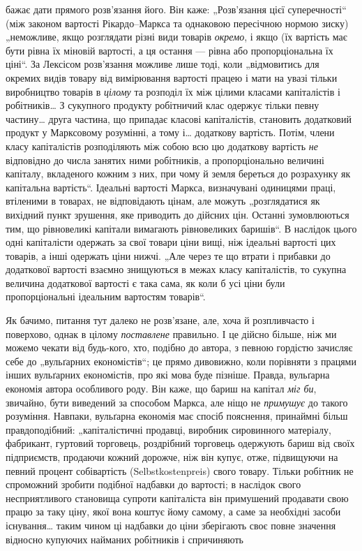 \parcont{}  %
бажає дати прямого розв’язання його. Він каже: „Розв’язання
цієї суперечності“ (між законом вартості Рікардо--Маркса та однаковою
пересічною нормою зиску) „неможливе, якщо розглядати
різні види товарів \emph{окремо}, і якщо (їх вартість має бути
рівна їх міновій вартості, а ця остання — рівна або пропорціональна
їх ціні“. За Лексісом розв’язання можливе лише тоді,
коли „відмовитись для окремих видів товару від вимірювання
вартості працею і мати на увазі тільки виробництво товарів
в \emph{цілому} та розподіл їх між цілими класами капіталістів і робітників\dots{}
З сукупного продукту робітничий клас одержує тільки
певну частину\dots{} друга частина, що припадає класові капіталістів,
становить додатковий продукт у Марксовому розумінні, а тому і\dots{}
додаткову вартість. Потім, члени класу капіталістів розподіляють
між собою всю цю додаткову вартість \emph{не} відповідно до числа
занятих ними робітників, а пропорціонально величині капіталу,
вкладеного кожним з них, при чому й земля береться до розрахунку
як капітальна вартість“. Ідеальні вартості Маркса, визначувані
одиницями праці, втіленими в товарах, не відповідають
цінам, але можуть „розглядатися як вихідний пункт зрушення,
яке приводить до дійсних цін. Останні зумовлюються тим, що
рівновеликі капітали вимагають рівновеликих баришів“. В наслідок
цього одні капіталісти одержать за свої товари ціни вищі,
ніж ідеальні вартості цих товарів, а інші одержать ціни нижчі.
„Але через те що втрати і прибавки до додаткової вартості
взаємно знищуються в межах класу капіталістів, то сукупна
величина додаткової вартості є така сама, як коли б усі ціни
були пропорціональні ідеальним вартостям товарів“.

Як бачимо, питання тут далеко не розв’язане, але, хоча й
розпливчасто і поверхово, однак в цілому \emph{поставлене} правильно.
І це дійсно більше, ніж ми можемо чекати від будь-кого,
хто, подібно до автора, з певною гордістю зачисляє себе
до „вульґарних економістів“; це прямо дивовижно, коли порівняти
з працями інших вульґарних економістів, про які мова буде
пізніше. Правда, вульґарна економія автора особливого роду.
Він каже, що бариш на капітал \emph{міг би}, звичайно, бути виведений
за способом Маркса, але ніщо не \emph{примушує} до такого розуміння.
Навпаки, вульґарна економія має спосіб пояснення, принаймні
більш правдоподібний: „капіталістичні продавці, виробник
сировинного матеріалу, фабрикант, гуртовий торговець,
роздрібний торговець одержують бариш від своїх підприємств,
продаючи кожний дорожче, ніж він купує, отже, підвищуючи
на певний процент собівартість (Selbstkostenpreis) свого товару.
Тільки робітник не спроможний зробити подібної надбавки до
вартості; в наслідок свого несприятливого становища супроти
капіталіста він примушений продавати свою працю за таку ціну,
якої вона коштує йому самому, а саме за необхідні засоби існування\dots{}
таким чином ці надбавки до ціни зберігають своє повне
значення відносно купуючих найманих робітників і спричиняють
\parbreak{}  %
